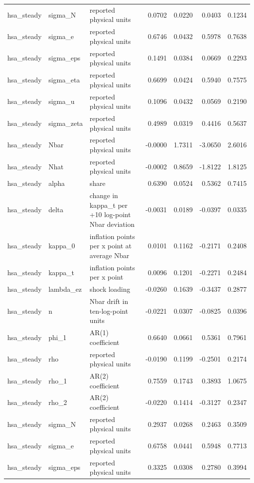 \begin{tabular}{lllrrrr}
hsa\_steady & sigma\_N & reported physical units & 0.0702 & 0.0220 & 0.0403 & 0.1234 \\
hsa\_steady & sigma\_e & reported physical units & 0.6746 & 0.0432 & 0.5978 & 0.7638 \\
hsa\_steady & sigma\_eps & reported physical units & 0.1491 & 0.0384 & 0.0669 & 0.2293 \\
hsa\_steady & sigma\_eta & reported physical units & 0.6699 & 0.0424 & 0.5940 & 0.7575 \\
hsa\_steady & sigma\_u & reported physical units & 0.1096 & 0.0432 & 0.0569 & 0.2190 \\
hsa\_steady & sigma\_zeta & reported physical units & 0.4989 & 0.0319 & 0.4416 & 0.5637 \\
hsa\_steady & Nbar & reported physical units & -0.0000 & 1.7311 & -3.0650 & 2.6016 \\
hsa\_steady & Nhat & reported physical units & -0.0002 & 0.8659 & -1.8122 & 1.8125 \\
hsa\_steady & alpha & share & 0.6390 & 0.0524 & 0.5362 & 0.7415 \\
hsa\_steady & delta & change in kappa\_t per +10 log-point Nbar deviation & -0.0031 & 0.0189 & -0.0397 & 0.0335 \\
hsa\_steady & kappa\_0 & inflation points per x point at average Nbar & 0.0101 & 0.1162 & -0.2171 & 0.2408 \\
hsa\_steady & kappa\_t & inflation points per x point & 0.0096 & 0.1201 & -0.2271 & 0.2484 \\
hsa\_steady & lambda\_ez & shock loading & -0.0260 & 0.1639 & -0.3437 & 0.2877 \\
hsa\_steady & n & Nbar drift in ten-log-point units & -0.0221 & 0.0307 & -0.0825 & 0.0396 \\
hsa\_steady & phi\_1 & AR(1) coefficient & 0.6640 & 0.0661 & 0.5361 & 0.7961 \\
hsa\_steady & rho & reported physical units & -0.0190 & 0.1199 & -0.2501 & 0.2174 \\
hsa\_steady & rho\_1 & AR(2) coefficient & 0.7559 & 0.1743 & 0.3893 & 1.0675 \\
hsa\_steady & rho\_2 & AR(2) coefficient & -0.0220 & 0.1414 & -0.3127 & 0.2347 \\
hsa\_steady & sigma\_N & reported physical units & 0.2937 & 0.0268 & 0.2463 & 0.3509 \\
hsa\_steady & sigma\_e & reported physical units & 0.6758 & 0.0441 & 0.5948 & 0.7713 \\
hsa\_steady & sigma\_eps & reported physical units & 0.3325 & 0.0308 & 0.2780 & 0.3994 \\

\end{tabular}
